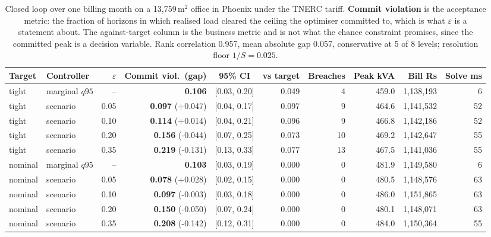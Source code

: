 \begin{table}[t]
\centering
\scriptsize
\setlength{\tabcolsep}{3pt}
\begin{tabular}{llrrcrrrrr}
\toprule
Target & Controller & $\varepsilon$ & Commit viol.\ (gap) & 95\% CI & vs target & Breaches & Peak kVA & Bill Rs & Solve ms \\
\midrule
tight & marginal $q95$ & -- & \textbf{0.106} & [0.03, 0.20] & 0.049 & 4 & 459.0 & 1,138,193 & 6 \\
tight & scenario & 0.05 & \textbf{0.097} (+0.047) & [0.04, 0.17] & 0.097 & 9 & 464.6 & 1,141,532 & 52 \\
tight & scenario & 0.10 & \textbf{0.114} (+0.014) & [0.04, 0.21] & 0.096 & 9 & 466.8 & 1,142,186 & 52 \\
tight & scenario & 0.20 & \textbf{0.156} (-0.044) & [0.07, 0.25] & 0.073 & 10 & 469.2 & 1,142,647 & 55 \\
tight & scenario & 0.35 & \textbf{0.219} (-0.131) & [0.13, 0.33] & 0.077 & 13 & 467.5 & 1,141,036 & 55 \\
nominal & marginal $q95$ & -- & \textbf{0.103} & [0.03, 0.19] & 0.000 & 0 & 481.9 & 1,149,580 & 6 \\
nominal & scenario & 0.05 & \textbf{0.078} (+0.028) & [0.02, 0.15] & 0.000 & 0 & 480.5 & 1,148,576 & 63 \\
nominal & scenario & 0.10 & \textbf{0.097} (-0.003) & [0.03, 0.18] & 0.000 & 0 & 486.0 & 1,151,865 & 63 \\
nominal & scenario & 0.20 & \textbf{0.150} (-0.050) & [0.07, 0.24] & 0.000 & 0 & 480.1 & 1,148,071 & 63 \\
nominal & scenario & 0.35 & \textbf{0.208} (-0.142) & [0.12, 0.31] & 0.000 & 0 & 484.0 & 1,150,364 & 55 \\
\bottomrule
\end{tabular}
\caption{Closed loop over one billing month on a 13{,}759\,m$^2$ office in Phoenix under the TNERC tariff. \textbf{Commit violation} is the acceptance metric: the fraction of horizons in which realised load cleared the ceiling the optimiser committed to, which is what $\varepsilon$ is a statement about. The against-target column is the business metric and is not what the chance constraint promises, since the committed peak is a decision variable. Rank correlation 0.957, mean absolute gap 0.057, conservative at 5 of 8 levels; resolution floor $1/S=0.025$.}
\label{tab:acceptance}
\end{table}
